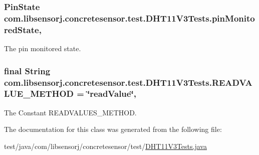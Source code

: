 \subsubsection[{pin\+Monitored\+State}]{\setlength{\rightskip}{0pt plus 5cm}Pin\+State com.\+libsensorj.\+concretesensor.\+test.\+D\+H\+T11\+V3\+Tests.\+pin\+Monitored\+State\hspace{0.3cm}{\ttfamily [static]}, {\ttfamily [private]}}\label{classcom_1_1libsensorj_1_1concretesensor_1_1test_1_1DHT11V3Tests_a326b78365c6bfa39eea9b86c28a6b780}
The pin monitored state. \hypertarget{classcom_1_1libsensorj_1_1concretesensor_1_1test_1_1DHT11V3Tests_abe087b3362924a1e965cf433b504d948}{}
\subsubsection[{R\+E\+A\+D\+V\+A\+L\+U\+E\+\_\+\+M\+E\+T\+H\+O\+D}]{\setlength{\rightskip}{0pt plus 5cm}final String com.\+libsensorj.\+concretesensor.\+test.\+D\+H\+T11\+V3\+Tests.\+R\+E\+A\+D\+V\+A\+L\+U\+E\+\_\+\+M\+E\+T\+H\+O\+D = \char`\"{}read\+Value\char`\"{}\hspace{0.3cm}{\ttfamily [static]}, {\ttfamily [private]}}\label{classcom_1_1libsensorj_1_1concretesensor_1_1test_1_1DHT11V3Tests_abe087b3362924a1e965cf433b504d948}
The Constant R\+E\+A\+D\+V\+A\+L\+U\+E\+S\+\_\+\+M\+E\+T\+H\+O\+D. 

The documentation for this class was generated from the following file\+:\begin{DoxyCompactItemize}
\item 
test/java/com/libsensorj/concretesensor/test/\hyperlink{DHT11V3Tests_8java}{D\+H\+T11\+V3\+Tests.\+java}\end{DoxyCompactItemize}
